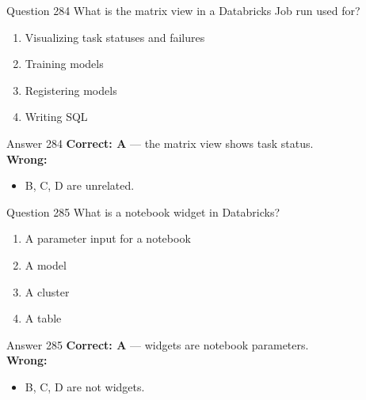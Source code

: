 \documentclass[aspectratio=169,11pt]{beamer}
\begin{document}
	\begin{frame}{Question 284}
		What is the matrix view in a Databricks Job run used for?
		\begin{enumerate}[label=\Alph*.]
			\item Visualizing task statuses and failures
			\item Training models
			\item Registering models
			\item Writing SQL
		\end{enumerate}
	\end{frame}
	\begin{frame}{Answer 284}
		\textbf{Correct: A} --- the matrix view shows task status.\\
		\vspace{0.5em}
		\textbf{Wrong:}
		\begin{itemize}
			\item B, C, D are unrelated.
		\end{itemize}
	\end{frame}
	
	\begin{frame}{Question 285}
		What is a notebook widget in Databricks?
		\begin{enumerate}[label=\Alph*.]
			\item A parameter input for a notebook
			\item A model
			\item A cluster
			\item A table
		\end{enumerate}
	\end{frame}
	\begin{frame}{Answer 285}
		\textbf{Correct: A} --- widgets are notebook parameters.\\
		\vspace{0.5em}
		\textbf{Wrong:}
		\begin{itemize}
			\item B, C, D are not widgets.
		\end{itemize}
	\end{frame}
	
\end{document}
